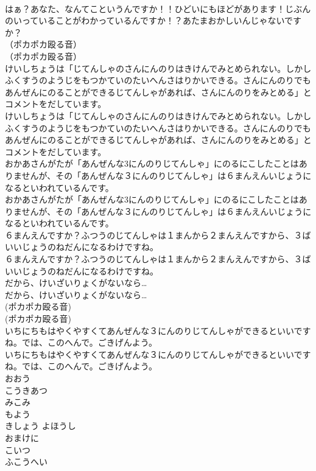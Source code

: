 \documentclass[8pt]{extreport}
\begin{document}
\begin{CJK}{UTF8}{min}
\\	はぁ？あなた、なんてこというんですか！！ひどいにもほどがあります！じぶんのいっていることがわかっているんですか！？あたまおかしいんじゃないですか？
\\	（ポカポカ殴る音）
\\	（ポカポカ殴る音）
\\	けいしちょうは「じてんしゃのさんにんのりはきけんでみとめられない。しかしふくすうのようじをもつかていのたいへんさはりかいできる。さんにんのりでもあんぜんにのることができるじてんしゃがあれば、さんにんのりをみとめる」とコメントをだしています。
\\	けいしちょうは「じてんしゃのさんにんのりはきけんでみとめられない。しかしふくすうのようじをもつかていのたいへんさはりかいできる。さんにんのりでもあんぜんにのることができるじてんしゃがあれば、さんにんのりをみとめる」とコメントをだしています。
\\	おかあさんがたが「あんぜんな3にんのりじてんしゃ」にのるにこしたことはありませんが、その「あんぜんな３にんのりじてんしゃ」は６まんえんいじょうになるといわれているんです。
\\	おかあさんがたが「あんぜんな3にんのりじてんしゃ」にのるにこしたことはありませんが、その「あんぜんな３にんのりじてんしゃ」は６まんえんいじょうになるといわれているんです。
\\	６まんえんですか？ふつうのじてんしゃは１まんから２まんえんですから、３ばいいじょうのねだんになるわけですね。
\\	６まんえんですか？ふつうのじてんしゃは１まんから２まんえんですから、３ばいいじょうのねだんになるわけですね。
\\	だから、けいざいりょくがないなら…
\\	だから、けいざいりょくがないなら…
\\	(ポカポカ殴る音)
\\	(ポカポカ殴る音)
\\	いちにちもはやくやすくてあんぜんな３にんのりじてんしゃができるといいですね。では、このへんで。ごきげんよう。
\\	いちにちもはやくやすくてあんぜんな３にんのりじてんしゃができるといいですね。では、このへんで。ごきげんよう。
\\	おおう
\\	こうきあつ
\\	みこみ
\\	もよう
\\	きしょう よほうし
\\	おまけに
\\	こいつ
\\	ふこうへい

\end{CJK}
\end{document}
